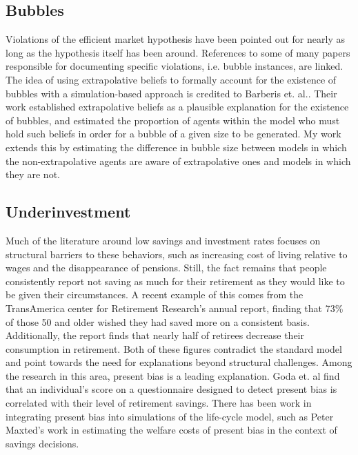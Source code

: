 \documentclass[10pt,twocolumn]{article}
\begin{document}
\subsection{Bubbles}
Violations of the efficient market hypothesis have been pointed out for nearly as long as the hypothesis itself has been around. References to some of many papers responsible for documenting specific violations, i.e. bubble instances, are linked.\cite{MedTermMomentum}\cite{LongTermReversal}\cite{volatility}\cite{bubbles} The idea of using extrapolative beliefs to formally account for the existence of bubbles with a simulation-based approach is credited to Barberis et. al..\cite{BarberisEtAl} Their work established extrapolative beliefs as a plausible explanation for the existence of bubbles, and estimated the proportion of agents within the model who must hold such beliefs in order for a bubble of a given size to be generated. My work extends this by estimating the difference in bubble size between models in which the non-extrapolative agents are aware of extrapolative ones and models in which they are not. 


\subsection{Underinvestment}
Much of the literature around low savings and investment rates focuses on structural barriers to these behaviors, such as increasing cost of living relative to wages and the disappearance of pensions. Still, the fact remains that people consistently report not saving as much for their retirement as they would like to be given their circumstances. A recent example of this comes from the TransAmerica center for Retirement Research’s annual report\cite{transamerica}, finding that 73\% of those 50 and older wished they had saved more on a consistent basis. Additionally, the report finds that nearly half of retirees decrease their consumption in retirement. Both of these figures contradict the standard model and point towards the need for explanations beyond structural challenges. Among the research in this area, present bias is a leading explanation. Goda et. al\cite{goda} find that an individual’s score on a questionnaire designed to detect present bias is correlated with their level of retirement savings. There has been work in integrating present bias into simulations of the life-cycle model, such as Peter Maxted’s work in estimating the welfare costs of present bias in the context of savings decisions.\cite{maxted} 
\end{document}
